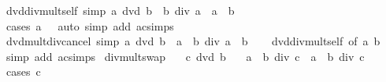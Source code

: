 \begin{isabellebody}
%
\endisadelimproof
\isanewline
{}\isamarkupfalse%
\ dvd{\isacharunderscore}{\kern0pt}div{\isacharunderscore}{\kern0pt}mult{\isacharunderscore}{\kern0pt}self\ {\isacharbrackleft}{\kern0pt}simp{\isacharbrackright}{\kern0pt}{\isacharcolon}{\kern0pt}\ {\isachardoublequoteopen}a\ dvd\ b\ {\isasymLongrightarrow}\ b\ div\ a\ {\isacharasterisk}{\kern0pt}\ a\ {\isacharequal}{\kern0pt}\ b{\isachardoublequoteclose}\isanewline
%
\isadelimproof
\ \ %
\endisadelimproof
%
\isatagproof
{}\isamarkupfalse%
\ {\isacharparenleft}{\kern0pt}cases\ {\isachardoublequoteopen}a\ {\isacharequal}{\kern0pt}\ {}{\isachardoublequoteclose}{\isacharparenright}{\kern0pt}\ {\isacharparenleft}{\kern0pt}auto\ simp\ add{\isacharcolon}{\kern0pt}\ ac{\isacharunderscore}{\kern0pt}simps{\isacharparenright}{\kern0pt}%
\endisatagproof
{\isafoldproof}%
%
\isadelimproof
\isanewline
%
\endisadelimproof
\isanewline
{}\isamarkupfalse%
\ dvd{\isacharunderscore}{\kern0pt}mult{\isacharunderscore}{\kern0pt}div{\isacharunderscore}{\kern0pt}cancel\ {\isacharbrackleft}{\kern0pt}simp{\isacharbrackright}{\kern0pt}{\isacharcolon}{\kern0pt}\ {\isachardoublequoteopen}a\ dvd\ b\ {\isasymLongrightarrow}\ a\ {\isacharasterisk}{\kern0pt}\ {\isacharparenleft}{\kern0pt}b\ div\ a{\isacharparenright}{\kern0pt}\ {\isacharequal}{\kern0pt}\ b{\isachardoublequoteclose}\isanewline
%
\isadelimproof
\ \ %
\endisadelimproof
%
\isatagproof
{}\isamarkupfalse%
\ dvd{\isacharunderscore}{\kern0pt}div{\isacharunderscore}{\kern0pt}mult{\isacharunderscore}{\kern0pt}self\ {\isacharbrackleft}{\kern0pt}of\ a\ b{\isacharbrackright}{\kern0pt}\ \isamarkupfalse%
\ {\isacharparenleft}{\kern0pt}simp\ add{\isacharcolon}{\kern0pt}\ ac{\isacharunderscore}{\kern0pt}simps{\isacharparenright}{\kern0pt}%
\endisatagproof
{\isafoldproof}%
%
\isadelimproof
\isanewline
%
\endisadelimproof
\isanewline
{}\isamarkupfalse%
\ div{\isacharunderscore}{\kern0pt}mult{\isacharunderscore}{\kern0pt}swap{\isacharcolon}{\kern0pt}\isanewline
\ \ \ {\isachardoublequoteopen}c\ dvd\ b{\isachardoublequoteclose}\isanewline
\ \ \ {\isachardoublequoteopen}a\ {\isacharasterisk}{\kern0pt}\ {\isacharparenleft}{\kern0pt}b\ div\ c{\isacharparenright}{\kern0pt}\ {\isacharequal}{\kern0pt}\ {\isacharparenleft}{\kern0pt}a\ {\isacharasterisk}{\kern0pt}\ b{\isacharparenright}{\kern0pt}\ div\ c{\isachardoublequoteclose}\isanewline
%
\isadelimproof
%
\endisadelimproof
%
\isatagproof
{}\isamarkupfalse%
\ {\isacharparenleft}{\kern0pt}cases\ {\isachardoublequoteopen}c\ {\isacharequal}{\kern0pt}\ {}{\isachardoublequoteclose}{\isacharparenright}{\kern0pt}\isanewline

\end{isabellebody}
